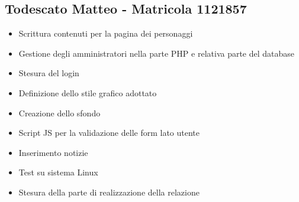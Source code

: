 \documentclass[openany, a4paper, 12pt]{report}
\begin{document}
	\subsection{Todescato Matteo - Matricola 1121857}
	\begin{itemize}
		\item Scrittura contenuti per la pagina dei personaggi
		\item Gestione degli amministratori nella parte PHP e relativa parte del database
		\item Stesura del login
		\item Definizione dello stile grafico adottato
		\item Creazione dello sfondo
		\item Script JS per la validazione delle form lato utente
		\item Inserimento notizie
		\item Test su sistema Linux
		\item Stesura della parte di realizzazione della relazione
	\end{itemize}
\end{document}
